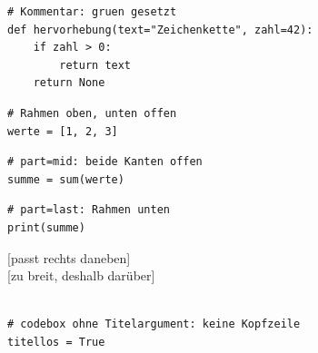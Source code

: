 

\begin{codebox}
\begin{lstlisting}[style=CodeExpert]
# Kommentar: gruen gesetzt
def hervorhebung(text="Zeichenkette", zahl=42):
    if zahl > 0:
        return text
    return None
\end{lstlisting}
\end{codebox}


\begin{codebox}[Teil 1 trägt den Titel\ZSFTitleTag{part=first}][part=first]
\begin{lstlisting}[style=CodeExpert]
# Rahmen oben, unten offen
werte = [1, 2, 3]
\end{lstlisting}
\end{codebox}
\begin{codebox}[][part=mid]
\begin{lstlisting}[style=CodeExpert]
# part=mid: beide Kanten offen
summe = sum(werte)
\end{lstlisting}
\end{codebox}
\begin{codebox}[][part=last]
\begin{lstlisting}[style=CodeExpert]
# part=last: Rahmen unten
print(summe)
\end{lstlisting}
\end{codebox}


\begin{defbox}
  \ttfamily
  [passt rechts daneben]\\
  [zu breit, deshalb darüber]\\
  \\
\end{defbox}

\begin{codebox}
\begin{lstlisting}[style=CodeExpert]
# codebox ohne Titelargument: keine Kopfzeile
titellos = True
\end{lstlisting}
\end{codebox}

\begin{ZSFlist}
\end{ZSFlist}
